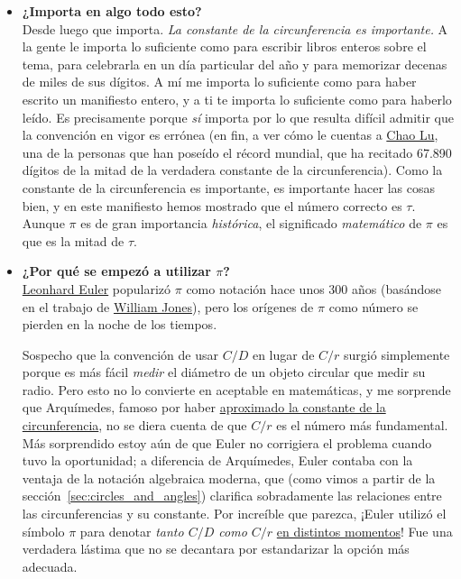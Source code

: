 \begin{itemize}
  \item \textbf{¿Importa en algo todo esto?} \\ Desde luego que importa. \emph{La constante de la circunferencia es importante.} A la gente le importa lo suficiente como para escribir libros enteros sobre el tema, para celebrarla en un día particular del año y para memorizar decenas de miles de sus dígitos. A mí me importa lo suficiente como para haber escrito un manifiesto entero, y a ti te importa lo suficiente como para haberlo leído. Es precisamente porque \emph{sí} importa por lo que resulta difícil admitir que la convención en vigor es errónea (en fin, a ver cómo le cuentas a \href{http://www.pi-world-ranking-list.com/lists/details/luchaointerview.html}{Chao Lu}, una de la personas que han poseído el récord mundial, que ha recitado 67.890 dígitos de la mitad de la verdadera constante de la circunferencia).
  Como la constante de la circunferencia es importante, es importante hacer las cosas bien, y en este manifiesto hemos mostrado que el número correcto es $\tau$. Aunque $\pi$ es de gran importancia \emph{histórica}, el significado \emph{matemático} de $\pi$ es que es la mitad de $\tau$.

  \item \textbf{¿Por qué se empezó a utilizar $\pi$?} \\ \href{https://es.wikipedia.org/wiki/Leonhard_Euler}{Leonhard Euler} popularizó $\pi$ como notación hace unos 300 años (basándose en el trabajo de \href{https://es.wikipedia.org/wiki/William_Jones_(matemático)}{William Jones}), pero los orígenes de $\pi$ como número se pierden en la noche de los tiempos.

Sospecho que la convención de usar $C/D$ en lugar de $C/r$ surgió simplemente porque es más fácil \emph{medir} el diámetro de un objeto circular que medir su radio. Pero esto no lo convierte en aceptable en matemáticas, y me sorprende que Arquímedes, famoso por haber \href{http://itech.fgcu.edu/faculty/clindsey/mhf4404/archimedes/archimedes.html}{aproximado la constante de la circunferencia}, no se diera cuenta de que $C/r$ es el número más fundamental. Más sorprendido estoy aún de que Euler no corrigiera el problema cuando tuvo la oportunidad; a diferencia de Arquímedes, Euler contaba con la ventaja de la notación algebraica moderna, que (como vimos a partir de la sección~\ref{sec:circles_and_angles}) clarifica sobradamente las relaciones entre las circunferencias y su constante. Por increíble que parezca, ¡Euler utilizó el símbolo $\pi$ para denotar \emph{tanto $C/D$ como $C/r$} \href{https://en.wikipedia.org/wiki/Pi#Adoption_of_the_symbol_%CF%80}{en distintos momentos}! Fue una verdadera lástima que no se decantara por estandarizar la opción más adecuada.


\end{itemize}
